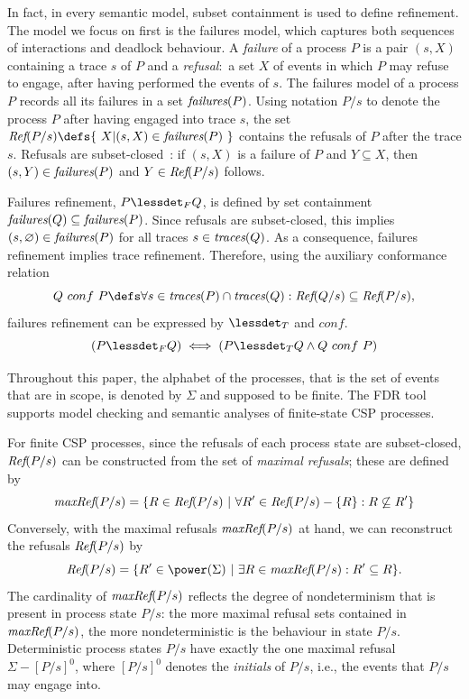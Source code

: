 In fact, in every semantic model, subset containment is used to define refinement. The
model we focus on first is the failures model, which captures both
sequences of interactions and deadlock behaviour. A \emph{failure} of a process $P$
is a pair $(s,X)$ containing a trace $s$ of $P$ and a \emph{refusal}:~a set $X$ of
events in which $P$ may refuse to engage, after having performed the events of
$s$. The failures model of a process $P$ records all its failures in a set
$\text{\it failures}(P)$. 
Using notation $P/s$ to denote the process $P$ after having engaged into trace $s$,
the set 
$\refs(P/s) \defs \{~X | (s,X) \in \fails(P)~\}$ contains the  refusals
of $P$ after the
trace $s$. 
Refusals are subset-closed~\cite{Hoare:1985:CSP:3921,Roscoe2010}: if $(s,X)$ is a failure of $P$ and $Y\subseteq X$,
then $(s,Y)\in\text{\it failures}(P)$ and $Y\in\text{\it Ref}(P/s)$ follows.

Failures refinement, $P \lessdet_F Q$, is defined by set containment 
$\text{\it failures}(Q)\subseteq\text{\it failures}(P)$. Since refusals are subset-closed, this implies
$(s,\varnothing)\in\text{\it failures}(P)$ for all traces $s\in\text{\it traces}(Q)$. As a consequence, failures 
refinement implies trace refinement. Therefore, using the auxiliary 
conformance relation
\begin{equation}\label{eq:conf}
  Q\ conf\ P \defs \forall s\in \trc(P) \cap \trc(Q): \refs(Q/s)
  \subseteq \refs(P/s),
\end{equation}
failures refinement can be expressed by $\lessdet_T$ and $conf$.
\begin{equation}\label{thm:fref-tref-conf}
(P \lessdet_F Q) \iff (P \lessdet_T Q \land Q\ conf\ P)
\end{equation}





Throughout this paper, the alphabet of the processes, that is the set of
events that are in scope, is denoted by $\Sigma$ and supposed to be finite. 
The
FDR tool~\cite{fdr} supports model checking and semantic analyses of
finite-state CSP processes.


For finite CSP processes, since the refusals of each process state are
subset-closed, $\text{\it Ref}(P/s)$ can be
constructed from the set of \emph{maximal refusals}; these are defined by 
%
\begin{equation}
\text{\it maxRef}(P/s) = \{ R \in\text{\it Ref}(P/s)~|~\forall R'\in \text{\it Ref}(P/s) - \{ R\}: R \not\subseteq R'\}
\end{equation}
%
Conversely, with the maximal refusals $\text{\it maxRef}(P/s)$ at hand, we can
reconstruct the refusals $\text{\it Ref}(P/s)$ by  
%
\begin{equation}
\refs(P/s) = \{ R'\in\power(\Sigma)~|~\exists R\in \maxrefs(P/s): R'\subseteq R \}.
\end{equation}
%
The cardinality of $\text{\it maxRef}(P/s)$ reflects the degree of
nondeterminism that is present in process state $P/s$: the more maximal refusal sets
contained in  $\text{\it maxRef}(P/s)$, the more nondeterministic is the behaviour in
state $P/s$. Deterministic process states $P/s$ have exactly the one maximal refusal
$\Sigma-[P/s]^0$, where $[P/s]^0$ denotes the \emph{initials} of $P/s$, i.e.,   the events that $P/s$ may engage into.


